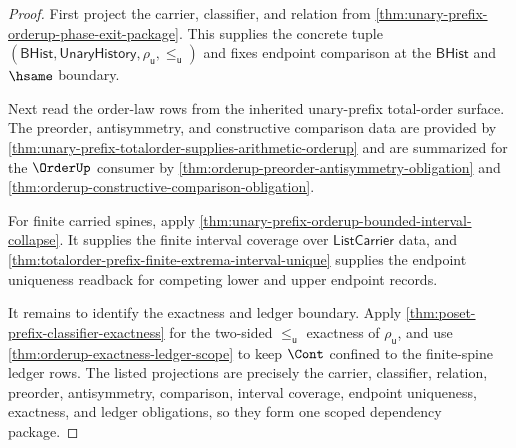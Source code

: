 \begin{proof}
First project the carrier, classifier, and relation from
\autoref{thm:unary-prefix-orderup-phase-exit-package}. This supplies the
concrete tuple
$(\mathsf{BHist},\mathsf{UnaryHistory},\rho_{\mathsf{u}},\le_{\mathsf{u}})$
and fixes endpoint comparison at the $\mathsf{BHist}$ and $\hsame$ boundary.

Next read the order-law rows from the inherited unary-prefix total-order
surface. The preorder, antisymmetry, and constructive comparison data are
provided by
\autoref{thm:unary-prefix-totalorder-supplies-arithmetic-orderup} and are
summarized for the $\OrderUp$ consumer by
\autoref{thm:orderup-preorder-antisymmetry-obligation} and
\autoref{thm:orderup-constructive-comparison-obligation}.

For finite carried spines, apply
\autoref{thm:unary-prefix-orderup-bounded-interval-collapse}. It supplies the
finite interval coverage over $\mathsf{ListCarrier}$ data, and
\autoref{thm:totalorder-prefix-finite-extrema-interval-unique} supplies the
endpoint uniqueness readback for competing lower and upper endpoint records.

It remains to identify the exactness and ledger boundary. Apply
\autoref{thm:poset-prefix-classifier-exactness} for the two-sided
$\le_{\mathsf{u}}$ exactness of $\rho_{\mathsf{u}}$, and use
\autoref{thm:orderup-exactness-ledger-scope} to keep $\Cont$ confined to the
finite-spine ledger rows. The listed projections are precisely the carrier,
classifier, relation, preorder, antisymmetry, comparison, interval coverage,
endpoint uniqueness, exactness, and ledger obligations, so they form one
scoped dependency package.
\end{proof}

